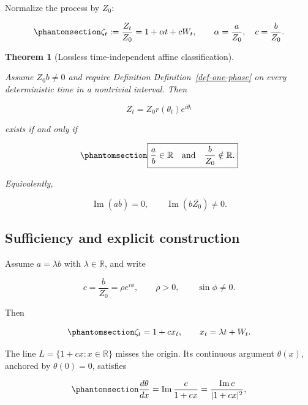 \documentclass[
  english,
  10pt,
  letterpaper,
  DIV=11,
  numbers=noendperiod]{scrartcl}
\theoremstyle{definition}
\theoremstyle{plain}
\newtheorem{theorem}{Theorem}[section]
\theoremstyle{plain}
\theoremstyle{remark}
\begin{document}
Normalize the process by \(Z_0\):

\begin{equation}\protect\phantomsection\label{eq-normalized-affine}{
\zeta_t:=\frac{Z_t}{Z_0}
=1+\alpha t+cW_t,
\qquad
\alpha=\frac a{Z_0},\quad c=\frac b{Z_0}.
}\end{equation}

\begin{theorem}[Lossless time-independent affine
classification]\protect\hypertarget{thm-affine-classification}{}\label{thm-affine-classification}

Assume \(Z_0b\ne0\) and require Definition
Definition~\ref{def-one-phase} on every deterministic time in a
nontrivial interval. Then

\[
Z_t=Z_0r(\theta_t)e^{i\theta_t}
\]

exists if and only if

\begin{equation}\protect\phantomsection\label{eq-affine-iff}{
\boxed{
\frac ab\in\mathbb R
\quad\text{and}\quad
\frac b{Z_0}\notin\mathbb R.
}
}\end{equation}

Equivalently,

\[
\operatorname{Im}(a\overline b)=0,
\qquad
\operatorname{Im}(b\overline{Z_0})\ne0.
\]

\end{theorem}

\subsection{Sufficiency and explicit
construction}\label{sufficiency-and-explicit-construction}

Assume \(a=\lambda b\) with \(\lambda\in\mathbb R\), and write

\[
c=\frac b{Z_0}=\rho e^{i\phi},
\qquad
\rho>0,\qquad
\sin\phi\ne0.
\]

Then

\begin{equation}\protect\phantomsection\label{eq-affine-scalar-state}{
\zeta_t=1+cx_t,\qquad x_t=\lambda t+W_t.
}\end{equation}

The line \(L=\{1+cx:x\in\mathbb R\}\) misses the origin. Its continuous
argument \(\theta(x)\), anchored by \(\theta(0)=0\), satisfies

\begin{equation}\protect\phantomsection\label{eq-angle-derivative}{
\frac{d\theta}{dx}
=\operatorname{Im}\frac{c}{1+cx}
=\frac{\operatorname{Im}c}{|1+cx|^2},
}\end{equation}
\end{document}
